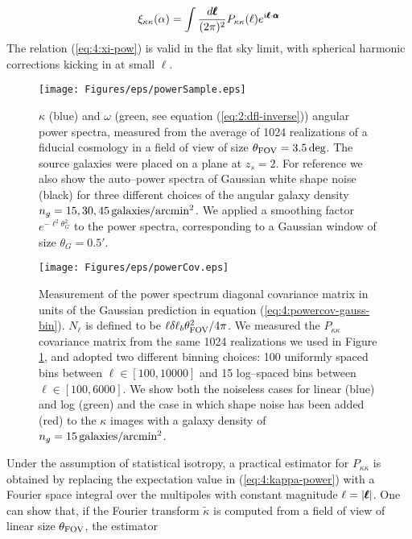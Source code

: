 \begin{equation}
\label{eq:4:xi-pow}
\xi_{\kappa\kappa}(\alpha) = \int \frac{d\pmb{\ell}}{(2\pi)^2}P_{\kappa\kappa}(\ell)e^{i\pmb{\ell}\cdot\pmb{\alpha}}
\end{equation}
%
The relation (\ref{eq:4:xi-pow}) is valid in the flat sky limit, with spherical harmonic corrections kicking in at small $\ell$.
%
\begin{figure}
\begin{center}
\texttt{[image: Figures/eps/powerSample.eps]}
\end{center}
\caption{$\kappa$ (blue) and $\omega$ (green, see equation (\ref{eq:2:dfl-inverse})) angular power spectra, measured from the average of 1024 realizations of a fiducial cosmology in a field of view of size $\theta_{\rm FOV}=3.5\,{\rm deg}$. The source galaxies were placed on a plane at $z_s=2$. For reference we also show the auto--power spectra of Gaussian white shape noise (black) for three different choices of the angular galaxy density $n_g=15,30,45\,{\rm galaxies}/{\rm arcmin}^2$. We applied a smoothing factor $e^{-\ell^2\theta_G^2}$ to the power spectra, corresponding to a Gaussian window of size $\theta_G=0.5'$.}
\label{fig:4:psample}
\end{figure}
%
\begin{figure}
\begin{center}
\texttt{[image: Figures/eps/powerCov.eps]}
\end{center}
\caption{Measurement of the power spectrum diagonal covariance matrix in units of the Gaussian prediction in equation (\ref{eq:4:powercov-gauss-bin}). $N_\ell$ is defined to be $\ell\delta\ell_b\theta_{\rm FOV}^2/4\pi$. We measured the $P_{\kappa\kappa}$ covariance matrix from the same 1024 realizations we used in Figure \ref{fig:4:psample}, and adopted two different binning choices: 100 uniformly spaced bins between $\ell\in[100,10000]$ and 15 log--spaced bins between $\ell\in[100,6000]$. We show both the noiseless cases for linear (blue) and log (green) and the case in which shape noise has been added (red) to the $\kappa$ images with a galaxy density of $n_g=15\,{\rm galaxies}/{\rm arcmin}^2$.}
\label{fig:4:pcov}
\end{figure}
%
Under the assumption of statistical isotropy, a practical estimator for $P_{\kappa\kappa}$ is obtained by replacing the expectation value in (\ref{eq:4:kappa-power}) with a Fourier space integral over the multipoles with constant magnitude $\ell=\vert\pmb{\ell}\vert$. One can show that, if the Fourier transform $\tilde{\kappa}$ is computed from a field of view of linear size $\theta_{\rm FOV}$, the estimator

